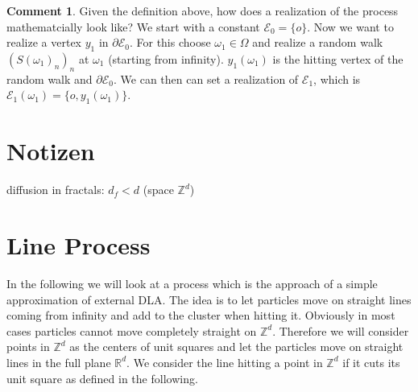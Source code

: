 \documentclass[12pt,a4paper]{scrartcl}
\numberwithin{equation}{section}
\numberwithin{equation}{section}%
\theoremstyle{definition}
\theoremstyle{definition}
\newtheorem{com}[thm]{Comment}
\begin{document}
\begin{com}
	Given the definition above, how does a realization of the process mathematcially look like? We start with a constant $\mathcal{E}_0 = \{o\}$. Now we want to realize a vertex $y_1$ in $\partial \mathcal{E}_0$. For this choose $\omega_1\in \Omega$ and realize a random walk $(S(\omega_1)_n)_n$ at $\omega_1$ (starting from infinity). $y_1(\omega_1)$ is the hitting vertex of the random walk and $\partial \mathcal{E}_0$. We can then can set a realization of $\mathcal{E}_1$, which is $\mathcal{E}_1(\omega_1)=\{o,y_1(\omega_1)\}$. 
\end{com}

\newpage


\section{Notizen}

diffusion in fractals: $d_f < d$ (space $\mathbb{Z}^d$)


\newpage


\section{Line Process}

In the following we will look at a process which is the approach of a simple approximation of external DLA. The idea is to let particles move on straight lines coming from infinity and add to the cluster when hitting it. Obviously in most cases particles cannot move completely straight on $\mathbb{Z}^d$. Therefore we will consider points in $\mathbb{Z}^d$ as the centers of unit squares and let the particles move on straight lines in the full plane $\mathbb{R}^d$. We consider the line hitting a point in $\mathbb{Z}^d$ if it cuts its unit square as defined in the following. 
\end{document}

